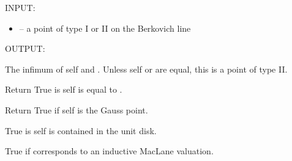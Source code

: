 \documentclass[letterpaper,10pt,english]{sphinxmanual}
\begin{document}
\begin{fulllineitems}
\begin{fulllineitems}
INPUT:
\begin{itemize}
\item {} 
 -- a point of type I or II on the Berkovich line

\end{itemize}

OUTPUT:

The infimum of self and . Unless self or  are equal,
this is a point of type II.

\end{fulllineitems}


\begin{fulllineitems}
\label{berkovich_line:mclf.berkovich.berkovich_line.TypeIPointOnBerkovichLine.is_equal}
Return True is self is equal to .

\end{fulllineitems}


\begin{fulllineitems}
\label{berkovich_line:mclf.berkovich.berkovich_line.TypeIPointOnBerkovichLine.is_gauss_point}
Return True if self is the Gauss point.

\end{fulllineitems}


\begin{fulllineitems}
\label{berkovich_line:mclf.berkovich.berkovich_line.TypeIPointOnBerkovichLine.is_in_unit_disk}
True is self is contained in the unit disk.

\end{fulllineitems}


\begin{fulllineitems}
\label{berkovich_line:mclf.berkovich.berkovich_line.TypeIPointOnBerkovichLine.is_inductive}
True if  corresponds to an inductive MacLane valuation.


\end{fulllineitems}
\end{fulllineitems}
\end{document}
